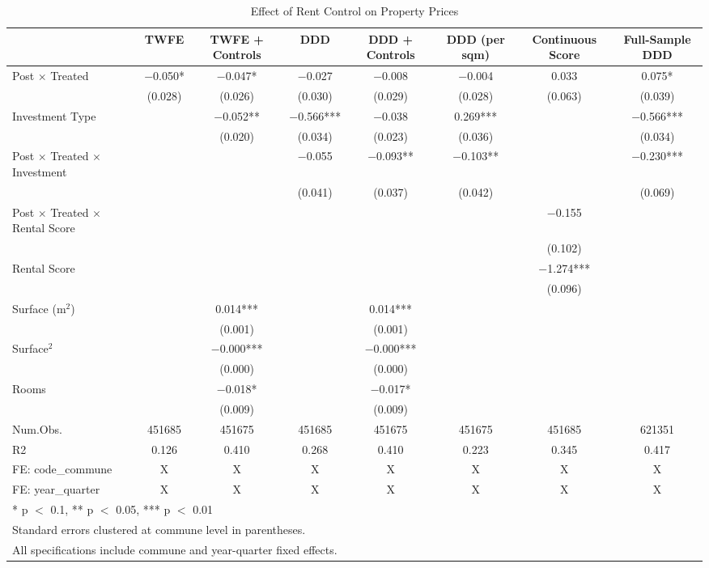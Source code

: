 \begin{table}
\centering
\caption{Effect of Rent Control on Property Prices}
\centering
\begin{tabular}[t]{lccccccc}
\toprule
  & TWFE & TWFE + Controls & DDD & DDD + Controls & DDD (per sqm) & Continuous Score & Full-Sample DDD\\
\midrule
Post $\times$ Treated & \num{-0.050}* & \num{-0.047}* & \num{-0.027} & \num{-0.008} & \num{-0.004} & \num{0.033} & \num{0.075}*\\
 & (\num{0.028}) & (\num{0.026}) & (\num{0.030}) & (\num{0.029}) & (\num{0.028}) & (\num{0.063}) & (\num{0.039})\\
Investment Type &  & \num{-0.052}** & \num{-0.566}*** & \num{-0.038} & \num{0.269}*** &  & \num{-0.566}***\\
 &  & (\num{0.020}) & (\num{0.034}) & (\num{0.023}) & (\num{0.036}) &  & (\num{0.034})\\
Post $\times$ Treated $\times$ Investment &  &  & \num{-0.055} & \num{-0.093}** & \num{-0.103}** &  & \num{-0.230}***\\
 &  &  & (\num{0.041}) & (\num{0.037}) & (\num{0.042}) &  & (\num{0.069})\\
Post $\times$ Treated $\times$ Rental Score &  &  &  &  &  & \num{-0.155} & \\
 &  &  &  &  &  & (\num{0.102}) & \\
Rental Score &  &  &  &  &  & \num{-1.274}*** & \\
 &  &  &  &  &  & (\num{0.096}) & \\
Surface (m$^2$) &  & \num{0.014}*** &  & \num{0.014}*** &  &  & \\
 &  & (\num{0.001}) &  & (\num{0.001}) &  &  & \\
Surface$^2$ &  & \num{-0.000}*** &  & \num{-0.000}*** &  &  & \\
 &  & (\num{0.000}) &  & (\num{0.000}) &  &  & \\
Rooms &  & \num{-0.018}* &  & \num{-0.017}* &  &  & \\
 &  & (\num{0.009}) &  & (\num{0.009}) &  &  & \\
\midrule
Num.Obs. & \num{451685} & \num{451675} & \num{451685} & \num{451675} & \num{451675} & \num{451685} & \num{621351}\\
R2 & \num{0.126} & \num{0.410} & \num{0.268} & \num{0.410} & \num{0.223} & \num{0.345} & \num{0.417}\\
FE: code_commune & X & X & X & X & X & X & X\\
FE: year_quarter & X & X & X & X & X & X & X\\
\bottomrule
\multicolumn{8}{l}{\rule{0pt}{1em}* p $<$ 0.1, ** p $<$ 0.05, *** p $<$ 0.01}\\
\multicolumn{8}{l}{\rule{0pt}{1em}Standard errors clustered at commune level in parentheses.}\\
\multicolumn{8}{l}{\rule{0pt}{1em}All specifications include commune and year-quarter fixed effects.}\\
\end{tabular}
\end{table}
